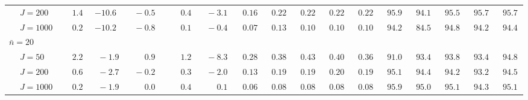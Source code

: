 \begin{sidewaystable}
\begin{threeparttable}
\begin{tabular}{llccccccccccccccc}
 & \nopagebreak $\;J=200$  & $\phantom{0}\phantom{-}1.4\phantom{0}$ & ${-}10.6\phantom{0}$ & $\phantom{0}{-}0.5\phantom{0}$ & $\phantom{0}\phantom{-}0.4\phantom{0}$ & $\phantom{0}{-}3.1\phantom{0}$ & $\phantom{0}0.16\phantom{0}$ & $\phantom{0}0.22\phantom{0}$ & $\phantom{0}0.22\phantom{0}$ & $\phantom{0}0.22\phantom{0}$ & $\phantom{0}0.22\phantom{0}$ & $\phantom{0}95.9\phantom{0}$ & $\phantom{0}94.1\phantom{0}$ & $\phantom{0}95.5\phantom{0}$ & $\phantom{0}95.7\phantom{0}$ & $\phantom{0}95.7\phantom{0}$ \\
 & \nopagebreak $\;J=1000$  & $\phantom{0}\phantom{-}0.2\phantom{0}$ & ${-}10.2\phantom{0}$ & $\phantom{0}{-}0.8\phantom{0}$ & $\phantom{0}\phantom{-}0.1\phantom{0}$ & $\phantom{0}{-}0.4\phantom{0}$ & $\phantom{0}0.07\phantom{0}$ & $\phantom{0}0.13\phantom{0}$ & $\phantom{0}0.10\phantom{0}$ & $\phantom{0}0.10\phantom{0}$ & $\phantom{0}0.10\phantom{0}$ & $\phantom{0}94.2\phantom{0}$ & $\phantom{0}84.5\phantom{0}$ & $\phantom{0}94.8\phantom{0}$ & $\phantom{0}94.2\phantom{0}$ & $\phantom{0}94.4\phantom{0}$ \\
\multicolumn{4}{l}{$\bar{n}=20$} \\  & \nopagebreak $\;J=50$  & $\phantom{0}\phantom{-}2.2\phantom{0}$ & $\phantom{0}{-}1.9\phantom{0}$ & $\phantom{0}\phantom{-}0.9\phantom{0}$ & $\phantom{0}\phantom{-}1.2\phantom{0}$ & $\phantom{0}{-}8.3\phantom{0}$ & $\phantom{0}0.28\phantom{0}$ & $\phantom{0}0.38\phantom{0}$ & $\phantom{0}0.43\phantom{0}$ & $\phantom{0}0.40\phantom{0}$ & $\phantom{0}0.36\phantom{0}$ & $\phantom{0}91.0\phantom{0}$ & $\phantom{0}93.4\phantom{0}$ & $\phantom{0}93.8\phantom{0}$ & $\phantom{0}93.4\phantom{0}$ & $\phantom{0}94.8\phantom{0}$ \\
 & \nopagebreak $\;J=200$  & $\phantom{0}\phantom{-}0.6\phantom{0}$ & $\phantom{0}{-}2.7\phantom{0}$ & $\phantom{0}{-}0.2\phantom{0}$ & $\phantom{0}\phantom{-}0.3\phantom{0}$ & $\phantom{0}{-}2.0\phantom{0}$ & $\phantom{0}0.13\phantom{0}$ & $\phantom{0}0.19\phantom{0}$ & $\phantom{0}0.19\phantom{0}$ & $\phantom{0}0.20\phantom{0}$ & $\phantom{0}0.19\phantom{0}$ & $\phantom{0}95.1\phantom{0}$ & $\phantom{0}94.4\phantom{0}$ & $\phantom{0}94.2\phantom{0}$ & $\phantom{0}93.2\phantom{0}$ & $\phantom{0}94.5\phantom{0}$ \\
 & \nopagebreak $\;J=1000$  & $\phantom{0}\phantom{-}0.2\phantom{0}$ & $\phantom{0}{-}1.9\phantom{0}$ & $\phantom{0}\phantom{-}0.0\phantom{0}$ & $\phantom{0}\phantom{-}0.4\phantom{0}$ & $\phantom{0}\phantom{-}0.1\phantom{0}$ & $\phantom{0}0.06\phantom{0}$ & $\phantom{0}0.08\phantom{0}$ & $\phantom{0}0.08\phantom{0}$ & $\phantom{0}0.08\phantom{0}$ & $\phantom{0}0.08\phantom{0}$ & $\phantom{0}95.9\phantom{0}$ & $\phantom{0}95.0\phantom{0}$ & $\phantom{0}95.1\phantom{0}$ & $\phantom{0}94.3\phantom{0}$ & $\phantom{0}95.1\phantom{0}$ \\

\end{tabular}
\end{threeparttable}
\end{sidewaystable}
